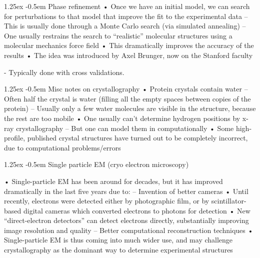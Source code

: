 \documentclass[8pt]{article}
\makeatletter
\newlength{\norm}
\newlength{\nrm}
\renewcommand{\paragraph}{%
  \@startsection{paragraph}{4}%
  {\z@}{1.25ex \@plus 2pt \@minus 2pt}{-0.5em}%
  {\fontsize{\f@size}{\nrm}\normalfont\bfseries}%
}
\makeatother
\begin{document}
\paragraph{Phase refinement}
• Once we have an initial model, we can search for
perturbations to that model that improve the fit to
the experimental data
– This is usually done through a Monte Carlo search (via
simulated annealing)
– One usually restrains the search to “realistic”
molecular structures using a molecular mechanics
force field
• This dramatically improves the accuracy of the results
• The idea was introduced by Axel Brunger, now on the
Stanford faculty

- Typically done with cross validations.

\paragraph{Misc notes on crystallography}
• Protein crystals contain water
– Often half the crystal is water (filling all the empty
spaces between copies of the protein)
– Usually only a few water molecules are visible in the
structure, because the rest are too mobile
• One usually can’t determine hydrogen positions
by x-ray crystallography
– But one can model them in computationally
• Some high-profile, published crystal structures
have turned out to be completely incorrect, due
to computational problems/errors 

\paragraph{Single particle EM (cryo electron microscopy)}

• Single-particle EM has been around for decades,
but it has improved dramatically in the last five
years due to:
– Invention of better cameras
• Until recently, electrons were detected either by
photographic film, or by scintillator-based digital cameras
which converted electrons to photons for detection
• New “direct-electron detectors” can detect electrons
directly, substantially improving image resolution and quality
– Better computational reconstruction techniques
• Single-particle EM is thus coming into much wider
use, and may challenge crystallography as the
dominant way to determine experimental structures
\end{document}
